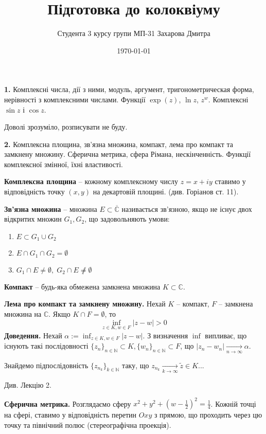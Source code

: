 \documentclass[14pt]{extarticle}
\title{Підготовка до колоквіуму}
\author{Студента 3 курсу групи МП-31 Захарова Дмитра}
\date{\today}
\begin{document}
\maketitle

\textbf{1.} Комплексні числа, дії з ними, модуль, аргумент, тригонометрическая форма, нерівності з комплексними числами. Функції $\exp(z)$, $\ln z$, $z^w$. Комплексні $\sin z$ і $\cos z$.

Доволі зрозуміло, розписувати не буду.

\textbf{2.} Комплексна площина, зв’язна множина, компакт, лема про компакт та замкнену множину. Сферична метрика, сфера Рімана, нескінченність. Функції комплексної змінної, їхні властивості.

\textbf{Комплексна площина} -- кожному комплексному числу $z=x+iy$ ставимо у відповідність точку $(x,y)$ на декартовій площині. (див. Горіанов ст. 11).

\textbf{Зв'язна множина} -- множина $E \subset \overline{\mathbb{C}}$ називається зв'язною, якщо не існує двох відкритих множин $G_1,G_2$, що задовольняють умови:
\begin{enumerate}
    \item $E \subset G_1 \cup G_2$
    \item $E \cap G_1 \cap G_2 = \emptyset$
    \item $G_1 \cap E \neq \emptyset, \; G_2 \cap E \not \neq \emptyset$
\end{enumerate}

\textbf{Компакт} -- будь-яка обмежена замкнена множина $K \subset \mathbb{C}$.

\textbf{Лема про компакт та замкнену множину.} Нехай $K$ -- компакт, $F$ -- замкнена множина на $\mathbb{C}$. Якщо $K \cap F = \emptyset$, то
\[
\inf_{z \in K, w \in F}|z-w| > 0
\]
\textbf{Доведення.} Нехай $\alpha := \inf_{z \in K, w \in F}|z-w|$. З визначення $\inf$ випливає, що існують такі послідовності $\{z_n\}_{n \in \mathbb{N}} \subset K, \{w_n\}_{n \in \mathbb{N}} \subset F$, що $|z_n-w_n| \xrightarrow[n \to \infty]{}\alpha$.

Знайдемо підпослідовність $\{z_{n_k}\}_{k \in \mathbb{N}}$ таку, що $z_{n_k} \xrightarrow[k \to \infty]{} \widetilde{z} \in K$...

Див. Лекцію 2.

\textbf{Сферична метрика.} Розглядаємо сферу $x^2+y^2+(w-\frac{1}{2})^2 = \frac{1}{4}$. Кожній точці на сфері, ставимо у відповідність перетин $Oxy$ з прямою, що проходить через цю точку та північний полюс (стереографічна проекція). 
\end{document}
